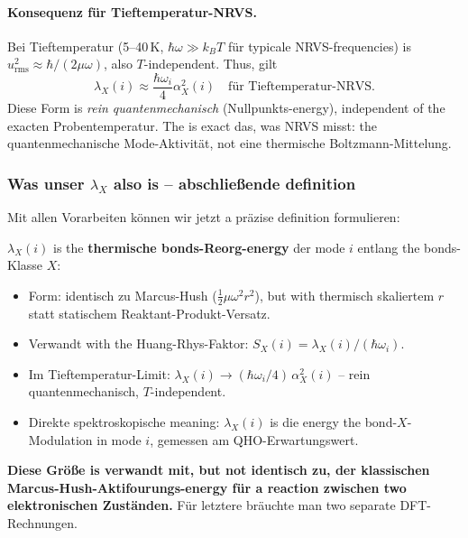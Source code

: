 \documentclass[11pt,a4paper,twoside]{article}
\theoremstyle{remark}
\begin{document}
\paragraph{Konsequenz f\"ur Tieftemperatur-NRVS.}
Bei Tieftemperatur (5--40\,K, $\hbar\omega \gg k_BT$ f\"ur typicale
NRVS-frequencies) is $u_\text{rms}^2 \approx \hbar/(2\mu\omega)$, also
$T$-independent. Thus, gilt
\begin{equation}
  \lambda_X(i) \approx \frac{\hbar\omega_i}{4}\alpha_X^2(i)
  \quad\text{f\"ur Tieftemperatur-NRVS}.
\end{equation}
Diese Form is \emph{rein quantenmechanisch} (Nullpunkts-energy),
independent of the exacten Probentemperatur. The is exact das, was
NRVS misst: the quantenmechanische Mode-Aktivit\"at, not eine
thermische Boltzmann-Mittelung.

\subsubsection*{Was unser $\lambda_X$ also is -- abschlie{\ss}ende definition}

Mit allen Vorarbeiten k\"onnen wir jetzt a pr\"azise definition
formulieren:

\begin{tcolorbox}[colback=accent!5,colframe=accent,
  title={Was $\lambda_X$ in \texttt{modenanalyse\_2fe2s} ist}]
$\lambda_X(i)$ is the \textbf{thermische bonds-Reorg-energy}
der mode $i$ entlang the bonds-Klasse $X$:
\begin{itemize}\setlength{\itemsep}{0pt}
  \item Form: identisch zu Marcus-Hush ($\tfrac{1}{2}\mu\omega^2 r^2$),
        but with thermisch skaliertem $r$ statt statischem
        Reaktant-Produkt-Versatz.
  \item Verwandt with the Huang-Rhys-Faktor: $S_X(i) =
        \lambda_X(i)/(\hbar\omega_i)$.
  \item Im Tieftemperatur-Limit:
        $\lambda_X(i) \to (\hbar\omega_i/4)\,\alpha_X^2(i)$
        -- rein quantenmechanisch, $T$-independent.
  \item Direkte spektroskopische meaning: $\lambda_X(i)$ is die
        energy the bond-$X$-Modulation in mode $i$, gemessen am
        QHO-Erwartungswert.
\end{itemize}

\textbf{Diese Gr\"o{\ss}e is verwandt mit, but not identisch zu, der
klassischen Marcus-Hush-Aktifourungs-energy f\"ur a reaction
zwischen two elektronischen Zust\"anden.} F\"ur letztere br\"auchte man
two separate DFT-Rechnungen.
\end{tcolorbox}
\end{document}
